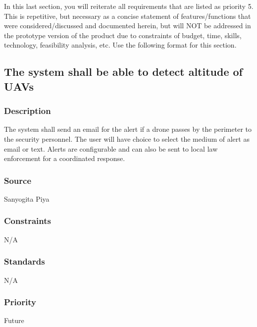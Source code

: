 In this last section, you will reiterate all requirements that are listed as priority 5. This is repetitive, but necessary as a concise statement of features/functions that were considered/discussed and documented herein, but will NOT be addressed in the prototype version of the product due to constraints of budget, time, skills, technology, feasibility analysis, etc. Use the following format for this section.

\subsection{The system shall be able to detect altitude of UAVs}
\subsubsection{Description}
The system shall send an email for the alert if a drone passes by the perimeter to the security personnel. The user will have choice to select the medium of alert as email or text. Alerts are configurable and can also be sent to local law enforcement for a coordinated response.
\subsubsection{Source}
Sanyogita Piya
\subsubsection{Constraints}
N/A
\subsubsection{Standards}
N/A
\subsubsection{Priority}
Future
